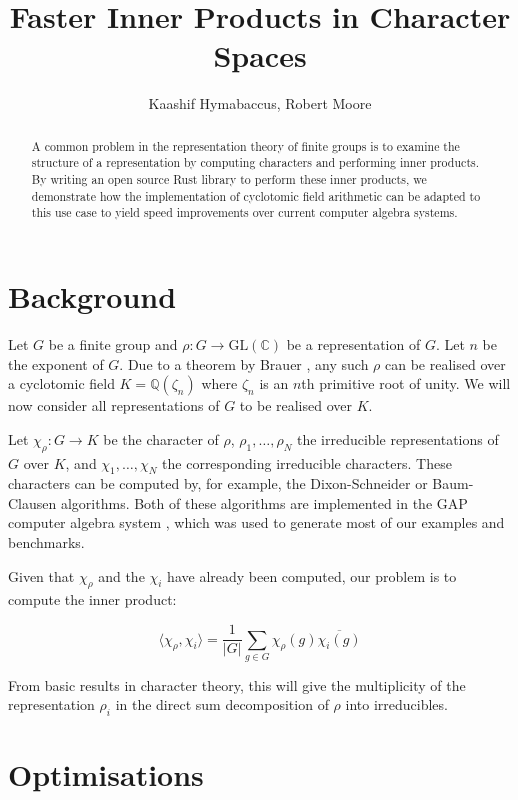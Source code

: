 \documentclass{article}
\title{Faster Inner Products in Character Spaces}
\author{Kaashif Hymabaccus, Robert Moore}
\begin{document}
\maketitle

\begin{abstract}
  A common problem in the representation theory of finite groups is to
  examine the structure of a representation by computing characters
  and performing inner products. By writing an open source Rust
  library to perform these inner products, we demonstrate how the
  implementation of cyclotomic field arithmetic can be adapted to this
  use case to yield speed improvements over current computer algebra
  systems.
\end{abstract}

\section{Background}

Let $G$ be a finite group and $\rho : G \to \text{GL}(\mathbb{C})$ be a
representation of $G$. Let $n$ be the exponent of $G$. Due to a
theorem by Brauer \cite{Brauer1945}, any such $\rho$ can be realised
over a cyclotomic field $K = \mathbb{Q}(\zeta_n)$ where $\zeta_n$ is
an $n$th primitive root of unity. We will now consider all
representations of $G$ to be realised over $K$.

Let $\chi_\rho : G \to K$ be the character of $\rho$,
$\rho_1, \ldots, \rho_N$ the irreducible representations of $G$ over
$K$, and $\chi_1, \ldots, \chi_N$ the corresponding irreducible
characters. These characters can be computed by, for example, the
Dixon-Schneider \cite{Schneider1990} or Baum-Clausen \cite{Baum1994}
algorithms. Both of these algorithms are implemented in the GAP
computer algebra system \cite{Gap2020}, which was used to generate
most of our examples and benchmarks.

Given that $\chi_\rho$ and the $\chi_i$ have already been computed,
our problem is to compute the inner product:

$$\langle \chi_\rho, \chi_i \rangle = \frac{1}{|G|} \sum_{g \in G} \chi_\rho(g) \overline{\chi_i(g)}$$

From basic results in character theory, this will give the
multiplicity of the representation $\rho_i$ in the direct sum
decomposition of $\rho$ into irreducibles.

\section{Optimisations}
\end{document}
